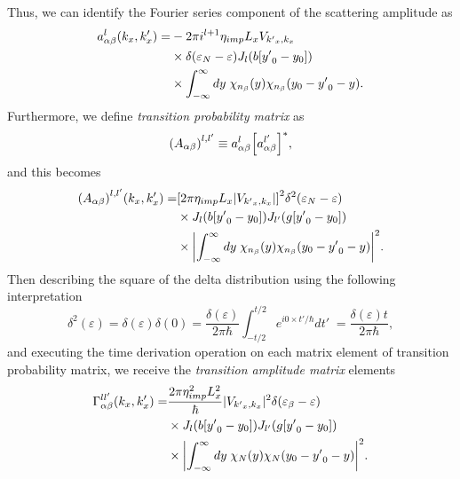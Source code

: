 Thus, we can identify the Fourier series component of the scattering amplitude as
\begin{equation} \label{eq_c36}
  \begin{aligned}
    a^l_{\alpha\beta}(k_x,k'_x) = &
    -2\pi i^{l+1}
    \eta_{imp} L_x V_{{k'}_x,k_x}\\
    & \times
    \delta(\varepsilon_{N} - \varepsilon)
    J_l\qty(b[{y'}_0 - y_0])\\
    & \times
    \int_{-\infty}^{\infty} dy \;
    {\chi}_{n_{\beta}}\qty(y)
    {\chi}_{n_{\beta}}\qty(y_0 - {y'}_0 - y).
  \end{aligned}
\end{equation}
Furthermore, we define \textit{transition probability matrix} as
\begin{equation} \label{eq_c37}
    \qty(A_{\alpha\beta})^{l,l'} \equiv
    a^l_{\alpha\beta}\qty[a^{l'}_{\alpha\beta}]^{*},
\end{equation}
and this becomes
\begin{equation} \label{eq_c38}
  \begin{aligned}
      \qty(A_{\alpha\beta})^{l,l'}(k_x,k'_x) = &
      \qty[{ 2 \pi \eta_{imp} L_x |V_{{k'}_x,k_x}|}]^2
      \delta^2(\varepsilon_{N} - \varepsilon) \\
      & \times
      J_l\qty(b[{y'}_0 - y_0]) J_{l'}\qty(g[{y'}_0 - y_0])\\
      & \times
      \qty|
      \int_{-\infty}^{\infty} dy \;
      {\chi}_{n_{\beta}}\qty(y)
      {\chi}_{n_{\beta}}\qty(y_0 - {y'}_0 - y)|^2.
  \end{aligned}
\end{equation}
Then describing the square of the delta distribution using the following interpretation \cite{dini16,kibis14}
\begin{equation} \label{eq_c39}
    \delta^2(\varepsilon) =
    \delta(\varepsilon)\delta(0) =
    \frac{\delta(\varepsilon)}{2\pi \hbar}
    \int_{-t/2}^{t/2} e^{i0\times t'/\hbar} dt'\; =
    \frac{\delta(\varepsilon)t}{2\pi \hbar},
\end{equation}
and executing the time derivation operation on each matrix element of transition probability matrix, we receive the \textit{transition amplitude matrix} elements
\begin{equation} \label{eq_40}
  \begin{aligned}
    \Gamma_{\alpha\beta}^{ll'}(k_x,k'_x) = &
    \frac { 2\pi \eta_{imp}^2 L_x^2}{ \hbar} |V_{{k'}_x,k_x}|^2
    \delta(\varepsilon_{\beta} - \varepsilon)\\
    & \times
    J_l\qty(b[{y'}_0 - y_0]) J_{l'}\qty(g[{y'}_0 - y_0]) \\
    & \times
    \qty|
    \int_{-\infty}^{\infty} dy \;
    {\chi}_{N}\qty(y)
    {\chi}_{N}\qty(y_0 - {y'}_0 - y)|^2.
  \end{aligned}
\end{equation}

